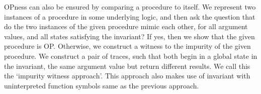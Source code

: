 \documentclass{llncs}
\begin{document}

OPness can also be ensured by comparing a procedure to itself. We
represent two instances of a procedure in some underlying logic, and
then ask the question that do the two instances of the given procedure
mimic each other, for all argument values, and all states satisfying
the invariant? If yes, then we show that the given procedure is
OP. Otherwise, we construct a witness to the impurity of the given
procedure. We construct a pair of traces, such that both begin in a
global state in the invariant, the same argument value but return
different results. We call this the `impurity witness approach'.
This approach also makes use of  invariant with uninterpreted function
symbols same as the previous approach.



\end{document}
